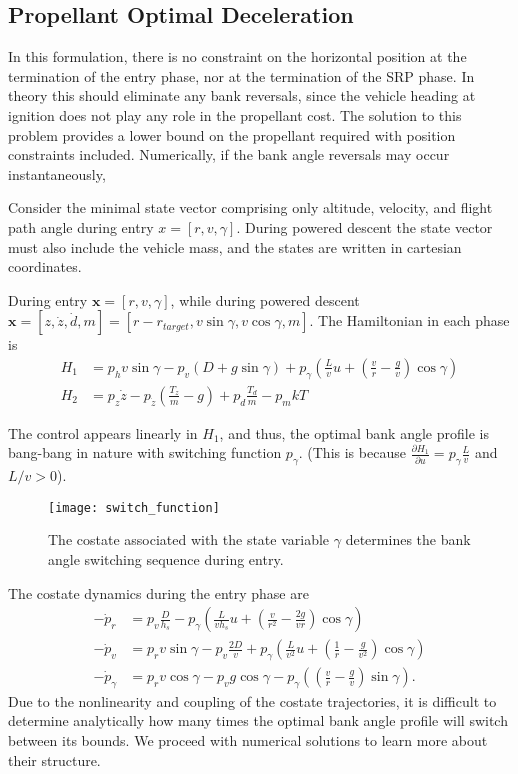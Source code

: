 \documentclass[]{article}
\newcommand{\state}{\ensuremath{\mathbf{x}}}
\begin{document}
\subsection{Propellant Optimal Deceleration}
In this formulation, there is no constraint on the horizontal position at the termination of the entry phase, nor at the termination of the SRP phase. In theory this should eliminate any bank reversals, since the vehicle heading at ignition does not play any role in the propellant cost. The solution to this problem provides a lower bound on the propellant required with position constraints included. Numerically, if the bank angle reversals may occur instantaneously, 

Consider the minimal state vector comprising only altitude, velocity, and flight path angle during entry $x = [r, v, \gamma]$. During powered descent the state vector must also include the vehicle mass, and the states are written in cartesian coordinates.

During entry $\state = [r, v, \gamma]$, while during powered descent $\state = [z, \dot{z}, \dot{d}, m]=[r-r_{target}, v\sin\gamma, v\cos\gamma, m]$. The Hamiltonian in each phase is
\begin{align}
H_1 &= p_hv\sin\gamma - p_v(D+g\sin\gamma) + p_{\gamma}\left(\frac{L}{v}u + (\frac{v}{r}-\frac{g}{v})\cos\gamma\right) \\
H_2 &= p_z\dot{z} - p_{\dot{z}}(\frac{T_z}{m}-g) + p_{\dot{d}}\frac{T_d}{m} - p_mkT
\end{align}

The control appears linearly in $H_1$, and thus, the optimal bank angle profile is bang-bang in nature with switching function $p_{\gamma}$. (This is because $\frac{\partial H_1}{\partial u} = p_{\gamma}\frac{L}{v}$ and $L/v > 0$).
\begin{figure}[h!]
	\centering
	\texttt{[image: switch\_function]}
	\caption{The costate associated with the state variable $\gamma$  determines the bank angle switching sequence during entry.}
\end{figure}
The costate dynamics during the entry phase are 
\begin{align}
-\dot{p}_r &= p_v\frac{D}{h_s} - p_{\gamma}\left(\frac{L}{vh_s}u + (\frac{v}{r^2}-\frac{2g}{vr})\cos\gamma\right) \\
 -\dot{p}_v &= p_rv\sin\gamma - p_v\frac{2D}{v} + p_{\gamma}\left(\frac{L}{v^2}u + (\frac{1}{r}-\frac{g}{v^2})\cos\gamma\right) \\
 -\dot{p}_{\gamma}&= p_rv\cos\gamma - p_vg\cos\gamma-p_{\gamma}\left((\frac{v}{r}-\frac{g}{v})\sin\gamma\right).
\end{align}
Due to the nonlinearity and coupling of the costate trajectories, it is difficult to determine analytically how many times the optimal bank angle profile will switch between its bounds. We proceed with numerical solutions to learn more about their structure.
\end{document}
